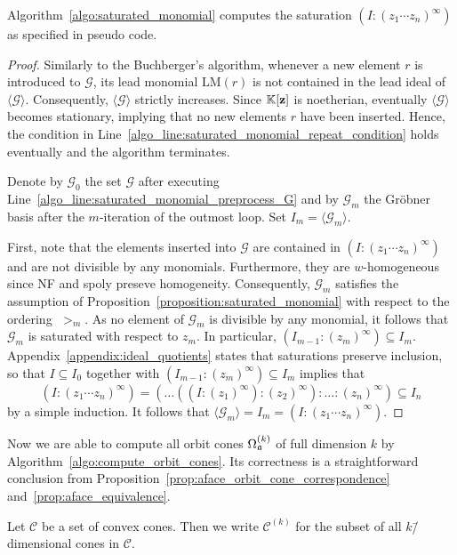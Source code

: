 \begin{prop}
	Algorithm~\ref{algo:saturated_monomial} computes the saturation $(I:(z_1\cdots z_n)^\infty)$ as specified in pseudo code.
\end{prop}
\begin{proof}
	Similarly to the Buchberger's algorithm, whenever a new element $r$ is introduced to $\mathcal{G}$, its lead monomial $\text{LM}(r)$ is not contained in the lead ideal of $\langle \mathcal{G} \rangle$. Consequently, $\langle \mathcal{G} \rangle$ strictly increases. Since $\mathbb{K}[\mathbf{z}]$ is noetherian, eventually $\langle \mathcal{G} \rangle$ becomes stationary, implying that no new elements $r$ have been inserted. Hence, the condition in Line~\ref{algo_line:saturated_monomial_repeat_condition} holds eventually and the algorithm terminates.
	
	Denote by $\mathcal{G}_0$ the set $\mathcal{G}$ after executing Line~\ref{algo_line:saturated_monomial_preprocess_G} and by $\mathcal{G}_m$ the Gröbner basis after the $m$-iteration of the outmost loop. Set $I_m = \langle \mathcal{G}_m \rangle$.
	
	First, note that the elements inserted into $\mathcal{G}$ are contained in $(I:(z_1\cdots z_n)^\infty)$ and are not divisible by any monomials. Furthermore, they are $w$-homogeneous since NF and spoly preseve homogeneity. Consequently, $\mathcal{G}_m$ satisfies the assumption of Proposition~\ref{proposition:saturated_monomial} with respect to the ordering $\;>_m$. As no element of $\mathcal{G}_m$ is divisible by any monomial, it follows that $\mathcal{G}_m$ is saturated with respect to $z_m$. In particular, $(I_{m-1} : (z_m)^\infty) \subseteq I_m$. Appendix~\ref{appendix:ideal_quotients} states that saturations preserve inclusion, so that $I\subseteq I_0$ together with $(I_{m-1} : (z_m)^\infty) \subseteq I_m$ implies that
	$$(I:(z_1\cdots z_n)^\infty) = (\dots((I:(z_1)^\infty):(z_2)^\infty):\dots : (z_n)^\infty) \subseteq I_n$$
	by a simple induction. It follows that $\langle \mathcal{G}_m \rangle = I_m = (I:(z_1\cdots z_n)^\infty)$.
\end{proof}

Now we are able to compute all orbit cones $\Omega_{\mathfrak{a}}^{(k)}$ of full dimension $k$ by Algorithm~\ref{algo:compute_orbit_cones}. Its correctness is a straightforward conclusion from  Proposition~\ref{prop:aface_orbit_cone_correspondence} and~\ref{prop:aface_equivalence}.

\begin{notation}
	Let $\mathcal{C}$ be a set of convex cones. Then we write $\mathcal{C}^{(k)}$ for the subset of all $k$\=/dimensional cones in $\mathcal{C}$.
\end{notation}


